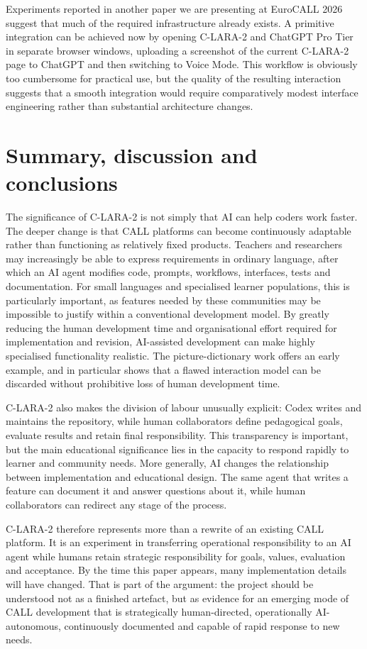 \documentclass[11pt,a4paper]{article}
\begin{document}
Experiments reported in another paper we are presenting at EuroCALL 2026 suggest that much of the required infrastructure already exists. A primitive integration can be achieved now by opening C-LARA-2 and ChatGPT Pro Tier in separate browser windows, uploading a screenshot of the current C-LARA-2 page to ChatGPT and then switching to Voice Mode. This workflow is obviously too cumbersome for practical use, but the quality of the resulting interaction suggests that a smooth integration would require comparatively modest interface engineering rather than substantial architecture changes.

\section{Summary, discussion and conclusions}

The significance of C-LARA-2 is not simply that AI can help coders work faster. The deeper change is that CALL platforms can become continuously adaptable rather than functioning as relatively fixed products. Teachers and researchers may increasingly be able to express requirements in ordinary language, after which an AI agent modifies code, prompts, workflows, interfaces, tests and documentation. For small languages and specialised learner populations, this is particularly important, as features needed by these communities may be impossible to justify within a conventional development model. By greatly reducing the human development time and organisational effort required for implementation and revision, AI-assisted development can make highly specialised functionality realistic. The picture-dictionary work offers an early example, and in particular shows that a flawed interaction model can be discarded without prohibitive loss of human development time.

C-LARA-2 also makes the division of labour unusually explicit: Codex writes and maintains the repository, while human collaborators define pedagogical goals, evaluate results and retain final responsibility. This transparency is important, but the main educational significance lies in the capacity to respond rapidly to learner and community needs. More generally, AI changes the relationship between implementation and educational design. The same agent that writes a feature can document it and answer questions about it, while human collaborators can redirect any stage of the process.

C-LARA-2 therefore represents more than a rewrite of an existing CALL platform. It is an experiment in transferring operational responsibility to an AI agent while humans retain strategic responsibility for goals, values, evaluation and acceptance. By the time this paper appears, many implementation details will have changed. That is part of the argument: the project should be understood not as a finished artefact, but as evidence for an emerging mode of CALL development that is strategically human-directed, operationally AI-autonomous, continuously documented and capable of rapid response to new needs.
\end{document}

